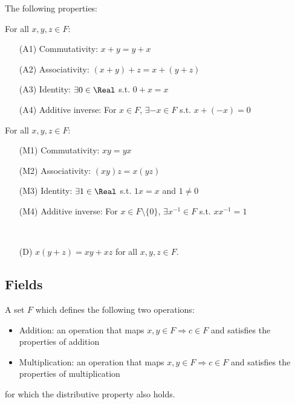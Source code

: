 \begin{definition}
  The following properties:

\begin{theorem}
  For all $x, y, z \in F$:
  \begin{itemize}
    \item[(A1)] Commutativity: $x + y = y + x$ 
    \item[(A2)] Associativity: $(x + y) + z = x + (y + z)$
    \item[(A3)] Identity: $\exists 0 \in \Real$ s.t. $0 + x = x$
    \item[(A4)] Additive inverse: For $x \in F$, $\exists -x \in F$ s.t. $x + (-x) = 0$
  \end{itemize}
\end{theorem}

\begin{theorem}
  For all $x, y, z \in F$:
  \begin{itemize}
    \item[(M1)] Commutativity: $xy = yx$ 
    \item[(M2)] Associativity: $(xy)z = x(yz)$
    \item[(M3)] Identity: $\exists 1 \in \Real$ s.t. $1x = x$ and $1 \neq 0$
    \item[(M4)] Additive inverse: For $x \in F \setminus \{ 0 \}$, $\exists x^{-1} \in F$ s.t. $xx^{-1} = 1$
  \end{itemize}
\end{theorem}

\begin{theorem} \ \\
  \begin{itemize}
    \item[(D)] $x(y + z) = xy + xz$ for all $x, y, z \in F$.
  \end{itemize}
\end{theorem}
\end{definition}

\subsection{Fields}

\begin{definition}[Field]
  A set $F$ which defines the following two operations:
  \begin{itemize}
    \item Addition: an operation that maps $x, y \in F \Rightarrow c \in F$ and satisfies the properties of addition
    \item Multiplication: an operation that maps $x, y \in F \Rightarrow c \in F$ and satisfies the properties of multiplication
  \end{itemize}
  for which the distributive property also holds.
\end{definition}

